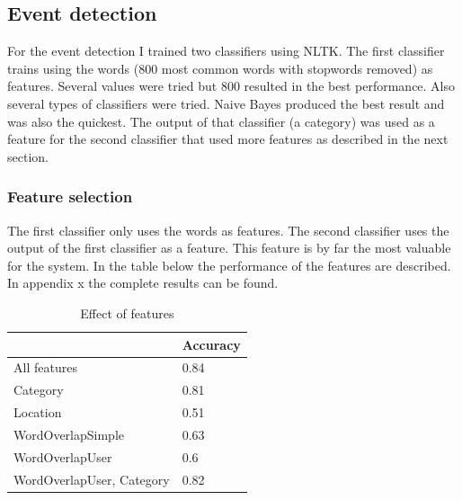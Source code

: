 \documentclass[
10pt, %
a4paper, %
oneside, %
headinclude,footinclude, %
BCOR5mm, %
]{scrartcl}
\begin{document}
\subsection{Event detection}
For the event detection I trained two classifiers using NLTK. The first classifier trains using the words (800 most common words with stopwords removed) as features. Several values were tried but 800 resulted in the best performance. Also several types of classifiers were tried. Naive Bayes produced the best result and was also the quickest. The output of that classifier (a category) was used as a feature for the second classifier that used more features as described in the next section.
\newpage
\subsubsection{Feature selection}
The first classifier only uses the words as features. The second classifier uses the output of the first classifier as a feature. This feature is by far the most valuable for the system. In the table below the performance of the features are described. In appendix x the complete results can be found.


\begin{table}[h]
\caption[Effect of features]{Effect of features  }
\begin{tabular}{|l|l|}
\hline
                          & Accuracy \\ \hline
All features              & 0.84     \\ \hline
Category                  & 0.81     \\ \hline
Location                  & 0.51     \\ \hline
WordOverlapSimple         & 0.63     \\ \hline
WordOverlapUser           & 0.6      \\ \hline
WordOverlapUser, Category & 0.82     \\ \hline
\end{tabular}

\end{table}
\end{document}
